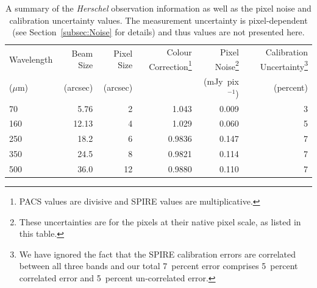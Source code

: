 \documentclass[useAMS,usenatbib,usegraphicx]{mn2e}
\begin{document}
\begin{table}
\begin{minipage}{2\columnwidth}
 \centering
 \caption{A summary of the \emph{Herschel} observation information as well as the pixel noise and calibration uncertainty values.  The measurement uncertainty is pixel-dependent (see Section~\ref{subsec:Noise} for details) and thus values are not presented here.}
 \label{table: herschel_char}
 \begin{tabular}{@{}lrrrrr@{}}
  \hline
  Wavelength & Beam Size & Pixel Size & Colour Correction\footnote{PACS values are divisive and SPIRE values are multiplicative.}  & Pixel Noise\footnote{These uncertainties are for the pixels at their native pixel scale, as listed in this table.}  & Calibration Uncertainty\footnote{We have ignored the fact that the SPIRE calibration errors are correlated between all three bands and our total 7~percent error comprises 5~percent correlated error and 5~percent un-correlated error.} \\
  ($\mu$m)   & (arcsec)  & (arcsec)   &                   & (mJy~pix$^{-1}$)  & (percent)       \\
  \hline
  70         & 5.76      & 2          & 1.043             & 0.009           & 3         \\
  160        & 12.13     & 4          & 1.029             & 0.060           & 5      \\
  250        & 18.2      & 6          & 0.9836            & 0.147           & 7  \\
  350        & 24.5      & 8          & 0.9821            & 0.114           & 7 \\
  500        & 36.0      & 12         & 0.9880            & 0.110           & 7 \\
  \hline
 \end{tabular}
\end{minipage}
\end{table}
\end{document}
